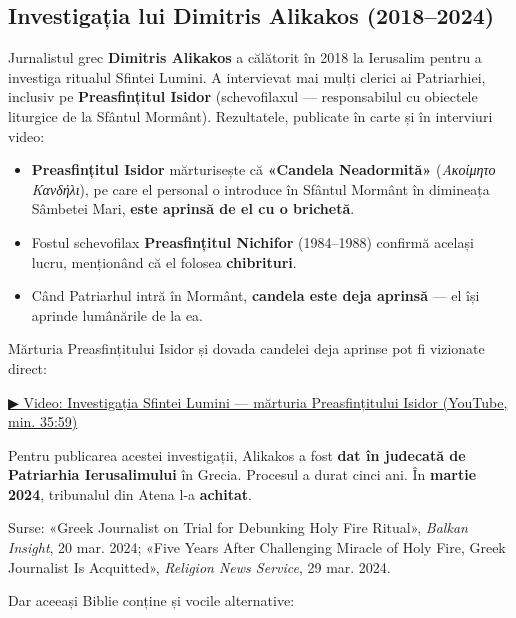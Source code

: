 \documentclass[12pt,a4paper,twoside,openany]{book}
\begin{document}
\subsection{Investigația lui Dimitris Alikakos (2018–2024)}
Jurnalistul grec \textbf{Dimitris Alikakos} a călătorit în 2018 la Ierusalim pentru a investiga ritualul Sfintei Lumini. A intervievat mai mulți clerici ai Patriarhiei, inclusiv pe \textbf{Preasfințitul Isidor} (schevofilaxul — responsabilul cu obiectele liturgice de la Sfântul Mormânt). Rezultatele, publicate în carte și în interviuri video:

\begin{itemize}
  \item \textbf{Preasfințitul Isidor} mărturisește că \textbf{«Candela Neadormită»} (\textit{Ακοίμητο Κανδήλι}), pe care el personal o introduce în Sfântul Mormânt în dimineața Sâmbetei Mari, \textbf{este aprinsă de el cu o brichetă}.
  \item Fostul schevofilax \textbf{Preasfințitul Nichifor} (1984–1988) confirmă același lucru, menționând că el folosea \textbf{chibrituri}.
  \item Când Patriarhul intră în Mormânt, \textbf{candela este deja aprinsă} — el își aprinde lumânările de la ea.
\end{itemize}
Mărturia Preasfințitului Isidor și dovada candelei deja aprinse pot fi vizionate direct:

\href{https://www.youtube.com/watch?v=m6cowtwedvU\&t=2159s}{▶ Video: Investigația Sfintei Lumini — mărturia Preasfințitului Isidor (YouTube, min. 35:59)}

Pentru publicarea acestei investigații, Alikakos a fost \textbf{dat în judecată de Patriarhia Ierusalimului} în Grecia. Procesul a durat cinci ani. În \textbf{martie 2024}, tribunalul din Atena l-a \textbf{achitat}.

Surse: «Greek Journalist on Trial for Debunking Holy Fire Ritual», \textit{Balkan Insight}, 20 mar. 2024; «Five Years After Challenging Miracle of Holy Fire, Greek Journalist Is Acquitted», \textit{Religion News Service}, 29 mar. 2024.

Dar aceeași Biblie conține și vocile alternative:
\end{document}
